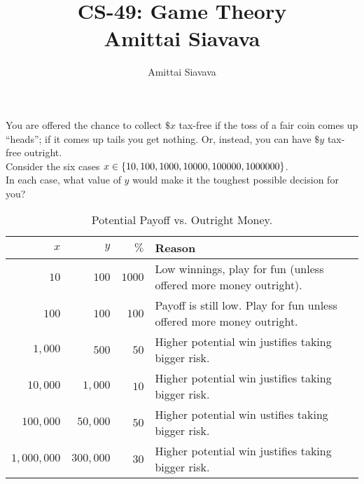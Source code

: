 \documentclass[11pt, reqno]{amsart}
\begin{document}

\title{CS-49: Game Theory\\ Amittai Siavava \\ }
\author{Amittai Siavava}


\setlength{\headheight}{13.0pt}
\setlength{\footskip}{15.0pt}

\maketitle

\begin{problem}[2]
  You are offered the chance to collect $\$x$ tax-free if the toss of a fair coin
  comes up ``heads''; if it comes up tails you get nothing.
  Or, instead, you can have $\$y$ tax-free outright.\\
  Consider the six cases $x \in \left\{10, 100, 1000, 10000, 100000, 1000000 \right\}$.\\
  In each case, what value of $y$ would make it the toughest possible decision for you?

  \begin{table}[H]
    \centering
    \begin{tabular}{r|r|r|l}
      $x$ & $y$ & $\%$ & Reason \\
    \midrule
      $10$ & $100$ & $1000$ & Low winnings, play for fun (unless offered more money outright). \\
      $100$ & $100$ & $100$ & Payoff is still low. Play for fun unless offered more money outright. \\
      $1,000$ & $500$ & $50$ & Higher potential win justifies taking bigger risk. \\
      $10,000$ & $1,000$ & $10$ & Higher potential win justifies taking bigger risk. \\
      $100,000$ & $50,000$ & $50$ & Higher potential win ustifies taking bigger risk. \\
      $1,000,000$ & $300,000$ & $30$ & Higher potential win justifies taking bigger risk. \\
    \toprule
    \end{tabular}
    \caption{Potential Payoff vs. Outright Money.}
  \end{table}
\end{problem}
\end{document}
